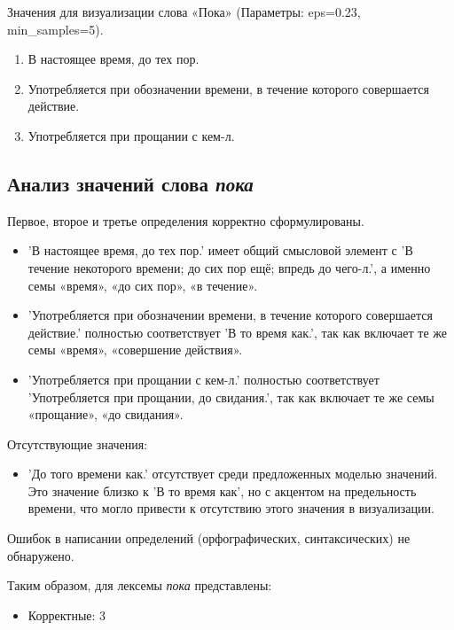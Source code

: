 Значения для визуализации слова «Пока» (Параметры: eps=0.23, min\_samples=5).

\begin{enumerate}
    \item В настоящее время, до тех пор.
    \item Употребляется при обозначении времени, в течение которого совершается действие.
    \item Употребляется при прощании с кем-л.
\end{enumerate}

\subsection*{Анализ значений слова \textit{пока}}

Первое, второе и третье определения корректно сформулированы.

\begin{itemize}
    \item ’В настоящее время, до тех пор.’ имеет общий смысловой элемент с
’В течение некоторого времени; до сих пор ещё; впредь до чего-л.’,
а именно семы «время», «до сих пор», «в течение».

    \item ’Употребляется при обозначении времени, в течение которого совершается действие.’ полностью соответствует
’В то время как.’, так как включает те же семы «время», «совершение действия».

    \item ’Употребляется при прощании с кем-л.’ полностью соответствует
’Употребляется при прощании, до свидания.’, так как включает те же семы «прощание», «до свидания».
\end{itemize}

Отсутствующие значения:
\begin{itemize}
    \item ’До того времени как.’ отсутствует среди предложенных моделью значений.
Это значение близко к ’В то время как’, но с акцентом на предельность времени,
что могло привести к отсутствию этого значения в визуализации.
\end{itemize}

Ошибок в написании определений (орфографических, синтаксических) не обнаружено.

Таким образом, для лексемы \textit{пока} представлены:

\begin{itemize}
    \item Корректные: 3
\end{itemize}

